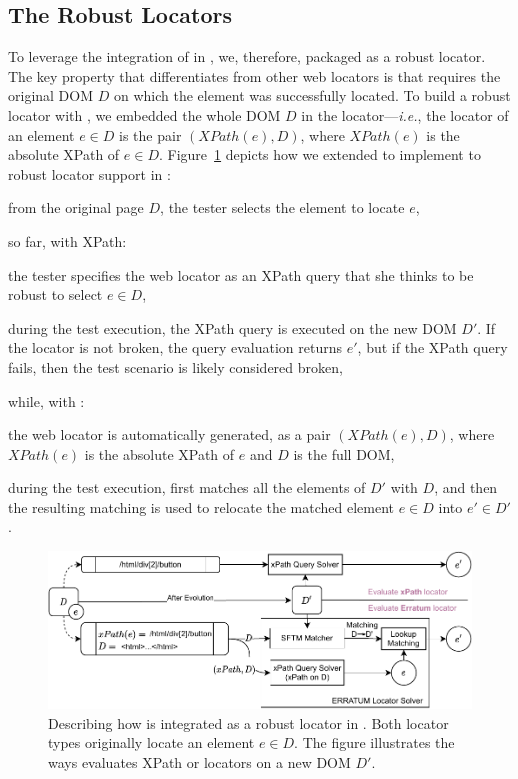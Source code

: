 \subsection{The \erratum Robust Locators}
To leverage the integration of \erratum in \cerberus, we, therefore, packaged \erratum as a robust locator.
The key property that differentiates \erratum from other web locators is that \erratum requires the original DOM $D$ on which the element was successfully located.
To build a robust locator with \erratum, we embedded the whole DOM $D$ in the locator---\emph{i.e.}, the \erratum locator of an element $e \in D$ is the pair $(XPath(e), D)$, where $XPath(e)$ is the absolute XPath of $e \in D$.
Figure~\ref{cerberus:fig:erratum_as_locator} depicts how we extended \erratum to implement to robust locator support in \cerberus:
\begin{compactenum}
    \item from the original page $D$, the tester selects the element to locate $e$,
    \item so far, with XPath:
    \begin{compactenum}
        \item the tester specifies the web locator as an XPath query that she thinks to be robust to select $e \in D$,
        \item during the test execution, the XPath query is executed on the new DOM $D'$. If the locator is not broken, the query evaluation returns $e'$, but if the XPath query fails, then the test scenario is likely considered broken,
    \end{compactenum}
    \item while, with \erratum{}:
    \begin{compactenum}
        \item the web locator is automatically generated, as a pair $(XPath(e), D)$, where $XPath(e)$ is the absolute XPath of $e$ and $D$ is the full DOM,
        \item during the test execution, \erratum{} first matches all the elements of $D'$ with $D$, and then the resulting matching is used to relocate the matched element $e \in D$ into $e' \in D'$.
    \end{compactenum}
\end{compactenum}

\begin{figure}[htbp]
    \centering
    \includegraphics[width=.9\linewidth]{cerberus/explanations/erratum_as_locator}
    \caption{Describing how \erratum is integrated as a robust locator in \cerberus. Both locator types originally locate an element $e \in D$. The figure illustrates the ways \cerberus evaluates XPath or \erratum locators on a new DOM $D'$.}
    \label{cerberus:fig:erratum_as_locator}
\end{figure}

